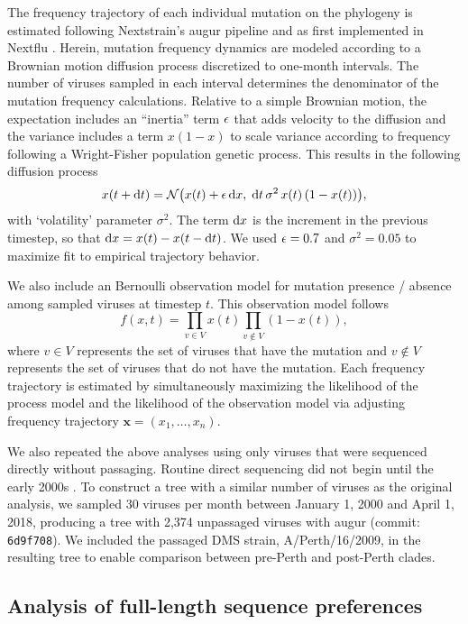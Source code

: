 The frequency trajectory of each individual mutation on the phylogeny is estimated following Nextstrain's augur pipeline and as first implemented in Nextflu \citep{Neher:2015jr}.
Herein, mutation frequency dynamics are modeled according to a Brownian motion diffusion process discretized to one-month intervals.
The number of viruses sampled in each interval determines the denominator of the mutation frequency calculations.
Relative to a simple Brownian motion, the expectation includes an ``inertia'' term $\epsilon$ that adds velocity to the diffusion and the variance includes a term $x(1-x)$ to scale variance according to frequency following a Wright-Fisher population genetic process.
This results in the following diffusion process
\begin{equation}
x(t+\mathrm{d}t) = \mathcal{N}\big( x(t) + \epsilon \, \mathrm{d}x , \; \mathrm{d}t \, \sigma^2 \, x(t) \, (1-x(t)) \big),
\end{equation}
with `volatility' parameter $\sigma^2$.
The term $\mathrm{d}x$ is the increment in the previous timestep, so that $\mathrm{d}x = x(t) - x(t-\mathrm{d}t)$.
We used $\epsilon = 0.7$ and $\sigma^2 = 0.05$ to maximize fit to empirical trajectory behavior.

We also include an Bernoulli observation model for mutation presence / absence among sampled viruses at timestep $t$.
This observation model follows
\begin{equation}
f(x,t) = \prod_{v\in V} x(t) \prod_{v\notin V} (1-x(t)),
\end{equation}
where $v\in V$ represents the set of viruses that have the mutation and $v\notin V$ represents the set of viruses that do not have the mutation.
Each frequency trajectory is estimated by simultaneously maximizing the likelihood of the process model and the likelihood of the observation model via adjusting frequency trajectory $\mathbf{x}=(x_1, \ldots, x_n)$.

We also repeated the above analyses using only viruses that were sequenced directly without passaging.
Routine direct sequencing did not begin until the early 2000s \citep{McWhite:2016fe}.
To construct a tree with a similar number of viruses as the original analysis, we sampled 30 viruses per month between January 1, 2000 and April 1, 2018, producing a tree with 2,374 unpassaged viruses with augur (commit: \texttt{6d9f708}).
We included the passaged DMS strain, A/Perth/16/2009, in the resulting tree to enable comparison between pre-Perth and post-Perth clades.

\subsection{Analysis of full-length sequence preferences}
\label{subsec:sequence-preferences}

